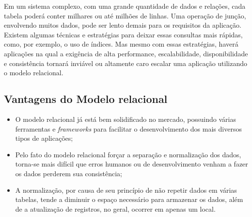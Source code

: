     
Em um sistema complexo, com uma grande quantidade de dados e relações, cada tabela poderá conter milhares ou até milhões de linhas. Uma operação de junção, envolvendo muitos dados, pode ser lento demais para os requisitos da aplicação. Existem algumas técnicas e estratégias para deixar essas consultas mais rápidas, como, por exemplo, o uso de índices. Mas mesmo com essas estratégias, haverá aplicações na qual a exigência de alta performance, escalabilidade, disponibilidade e consistência tornará inviável ou altamente caro escalar uma aplicação utilizando o modelo relacional.


\subsection{Vantagens do Modelo relacional}
    
\begin{itemize}
    \item O modelo relacional já está bem solidificado no mercado, possuindo várias ferramentas e \textit{frameworks} para facilitar o desenvolvimento dos mais diversos tipos de aplicações;
        
    \item Pelo fato do modelo relacional forçar a separação e normalização dos dados, torna-se mais difícil que erros humanos ou de desenvolvimento venham a fazer os dados perderem sua consistência;
        
        
        
    \item A normalização, por causa de seu princípio de não repetir dados em várias tabelas, tende a diminuir o espaço necessário para armazenar os dados, além de a atualização de registros, no geral, ocorrer em apenas um local.
\end{itemize}
    
